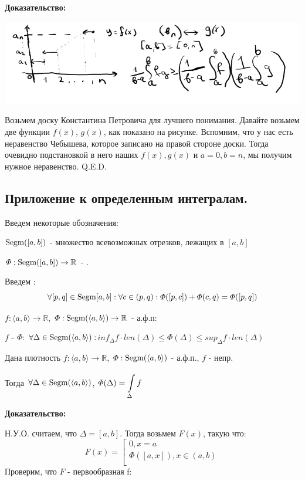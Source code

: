 \textbf{Доказательство:}
\begin{center}
   \includegraphics[width = 19 cm]{assets/integral_2.png}
\end{center}
Возьмем доску Константина Петровича для лучшего понимания. Давайте возьмем две функции $f(x)$, $g(x)$, как показано на рисунке. Вспомним, что у нас есть неравенство Чебышева, которое записано на правой стороне доски. Тогда очевидно подстановкой в него наших $f(x),g(x)$ и $a=0,b=n$, мы получим нужное неравенство.
\hfill Q.E.D.

\pagebreak
\subsection{Приложение к определенным интегралам.}

Введем некоторые обозначения:

$\text{Segm} ([a,b])$ - множество всевозможных отрезков, лежащих в $[a,b]$

$\varPhi: \text{Segm}([a,b]) \rightarrow \mathbb{R}$ - .

Введем :
$$\forall [p,q] \in \text{Segm}[a,b]: \forall c \in (p,q): \varPhi([p,c]) + \varPhi(c,q)= \varPhi([p,q])$$

 $f: \langle a,b \rangle \rightarrow \mathbb{R}$, $\varPhi: \text{Segm}(\langle a,b \rangle) \rightarrow \mathbb{R}$ - а.ф.п:

$f$ -  $\varPhi$: $\forall \Delta \in \text{Segm} (\langle a,b\rangle):$$inf_{\Delta} f \cdot len(\Delta)\leq \varPhi(\Delta)\leq sup_{\Delta} f \cdot len(\Delta)$


Дана плотность
$f:\langle a,b\rangle \rightarrow \mathbb{R}$, $\varPhi: \text{Segm}(\langle a,b\rangle)$ - а.ф.п., $f$ - непр.

Тогда $\forall \Delta \in \text{Segm}(\langle a,b\rangle) $, $\varPhi(\Delta) = \displaystyle\int\limits_{\Delta}^{}f$

\textbf{Доказательство:}

Н.У.О. считаем, что $\Delta = [a,b]$. Тогда возьмем $F(x)$, такую что:
$$F(x) = \left[ 
      \begin{gathered} 
        0, x=a \\ 
        \varPhi([a,x]), x \in (a,b) \\ 
      \end{gathered} 
\right.$$
Проверим, что $F$ - первообразная f:

